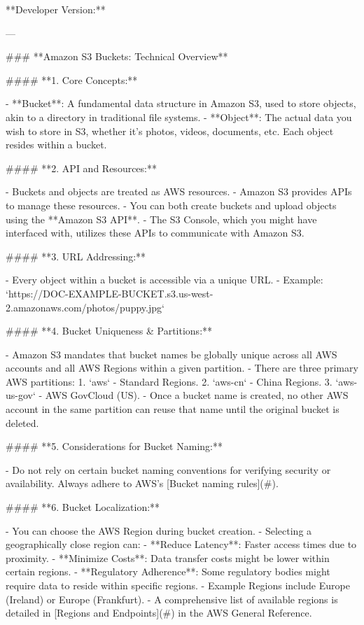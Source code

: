 **Developer Version:**

---

### **Amazon S3 Buckets: Technical Overview**

#### **1. Core Concepts:**

- **Bucket**: A fundamental data structure in Amazon S3, used to store objects, akin to a directory in traditional file systems.
- **Object**: The actual data you wish to store in S3, whether it's photos, videos, documents, etc. Each object resides within a bucket.

#### **2. API and Resources:**

- Buckets and objects are treated as AWS resources.
- Amazon S3 provides APIs to manage these resources.
- You can both create buckets and upload objects using the **Amazon S3 API**.
- The S3 Console, which you might have interfaced with, utilizes these APIs to communicate with Amazon S3.

#### **3. URL Addressing:**

- Every object within a bucket is accessible via a unique URL.
  - Example: `https://DOC-EXAMPLE-BUCKET.s3.us-west-2.amazonaws.com/photos/puppy.jpg`

#### **4. Bucket Uniqueness & Partitions:**

- Amazon S3 mandates that bucket names be globally unique across all AWS accounts and all AWS Regions within a given partition.
- There are three primary AWS partitions: 
  1. `aws` - Standard Regions.
  2. `aws-cn` - China Regions.
  3. `aws-us-gov` - AWS GovCloud (US).
- Once a bucket name is created, no other AWS account in the same partition can reuse that name until the original bucket is deleted.

#### **5. Considerations for Bucket Naming:**

- Do not rely on certain bucket naming conventions for verifying security or availability. Always adhere to AWS's [Bucket naming rules](#).

#### **6. Bucket Localization:**

- You can choose the AWS Region during bucket creation.
- Selecting a geographically close region can:
  - **Reduce Latency**: Faster access times due to proximity.
  - **Minimize Costs**: Data transfer costs might be lower within certain regions.
  - **Regulatory Adherence**: Some regulatory bodies might require data to reside within specific regions.
- Example Regions include Europe (Ireland) or Europe (Frankfurt).
- A comprehensive list of available regions is detailed in [Regions and Endpoints](#) in the AWS General Reference.

